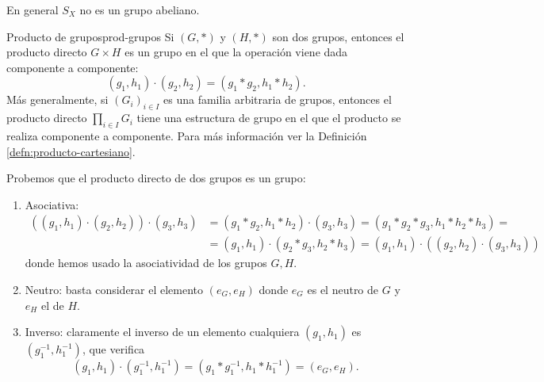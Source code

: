 \begin{remark}
    En general $S_X$ no es un grupo abeliano.
\end{remark}

\begin{example}{Producto de grupos}{prod-grupos}
    Si \((G, *)\) y \((H, *)\) son dos grupos, entonces el {producto directo} \(G \times H\) es un grupo en el que la operación viene dada componente a componente:
    \[
    (g_1, h_1) \cdot (g_2, h_2) = (g_1 * g_2, h_1 * h_2).
    \]
    Más generalmente, si \((G_i)_{i\in I}\) es una familia arbitraria de grupos, entonces el producto directo \(\prod_{i\in I} G_i\) tiene una estructura de grupo en el que el producto se realiza componente a componente. Para más información ver la Definición \ref{defn:producto-cartesiano}.
\end{example}

Probemos que el producto directo de dos grupos es un grupo:

\begin{proofbox}
    \begin{enumerate}
        \item Asociativa:
        \begin{align*}
            ((g_1, h_1) \cdot (g_2, h_2)) \cdot (g_3, h_3) &= (g_1 * g_2, h_1 * h_2) \cdot (g_3, h_3) = (g_1 * g_2 * g_3, h_1 * h_2 * h_3) = \\
            &= (g_1, h_1) \cdot (g_2 * g_3, h_2 * h_3) = (g_1, h_1) \cdot ((g_2, h_2) \cdot (g_3, h_3))
        \end{align*}
        donde hemos usado la asociatividad de los grupos $G, H$.
        \item Neutro: basta considerar el elemento $(e_G, e_H)$ donde $e_G$ es el neutro de $G$ y $e_H$ el de $H$.
        \item Inverso: claramente el inverso de un elemento cualquiera $(g_1, h_1)$ es $(g_1^{-1}, h_1^{-1})$, que verifica
        \[
        (g_1, h_1) \cdot (g_1^{-1}, h_1^{-1}) = (g_1 * g_1^{-1}, h_1 * h_1^{-1}) = (e_G, e_H).
        \]
    \end{enumerate}
\end{proofbox}

